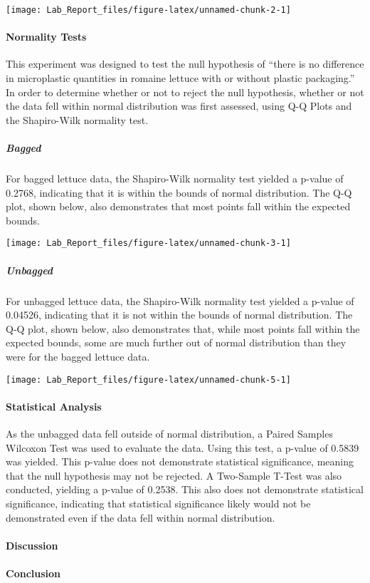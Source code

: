 \documentclass[]{article}
\let\oldparagraph\paragraph
\renewcommand{\paragraph}[1]{\oldparagraph{#1}\mbox{}}
\let\oldsubparagraph\subparagraph
\renewcommand{\subparagraph}[1]{\oldsubparagraph{#1}\mbox{}}
\begin{document}
\begin{center}\texttt{[image: Lab\_Report\_files/figure-latex/unnamed-chunk-2-1]} \end{center}

\hypertarget{normality-tests}{%
\paragraph{\texorpdfstring{Normality Tests\\
}{Normality Tests }}\label{normality-tests}}

This experiment was designed to test the null hypothesis of ``there is
no difference in microplastic quantities in romaine lettuce with or
without plastic packaging.'' In order to determine whether or not to
reject the null hypothesis, whether or not the data fell within normal
distribution was first assessed, using Q-Q Plots and the Shapiro-Wilk
normality test.

\hypertarget{bagged}{%
\subparagraph{Bagged}\label{bagged}}

For bagged lettuce data, the Shapiro-Wilk normality test yielded a
p-value of 0.2768, indicating that it is within the bounds of normal
distribution. The Q-Q plot, shown below, also demonstrates that most
points fall within the expected bounds.

\begin{center}\texttt{[image: Lab\_Report\_files/figure-latex/unnamed-chunk-3-1]} \end{center}

\hypertarget{unbagged}{%
\subparagraph{Unbagged}\label{unbagged}}

For unbagged lettuce data, the Shapiro-Wilk normality test yielded a
p-value of 0.04526, indicating that it is not within the bounds of
normal distribution. The Q-Q plot, shown below, also demonstrates that,
while most points fall within the expected bounds, some are much further
out of normal distribution than they were for the bagged lettuce data.

\begin{center}\texttt{[image: Lab\_Report\_files/figure-latex/unnamed-chunk-5-1]} \end{center}

\hypertarget{statistical-analysis}{%
\paragraph{Statistical Analysis}\label{statistical-analysis}}

As the unbagged data fell outside of normal distribution, a Paired
Samples Wilcoxon Test was used to evaluate the data. Using this test, a
p-value of 0.5839 was yielded. This p-value does not demonstrate
statistical significance, meaning that the null hypothesis may not be
rejected. A Two-Sample T-Test was also conducted, yielding a p-value of
0.2538. This also does not demonstrate statistical significance,
indicating that statistical significance likely would not be
demonstrated even if the data fell within normal distribution.

\hypertarget{discussion}{%
\paragraph{Discussion}\label{discussion}}

\hypertarget{conclusion}{%
\paragraph{Conclusion}\label{conclusion}}
\end{document}
